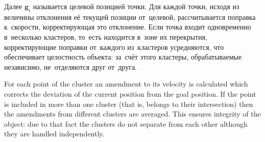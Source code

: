 \documentclass[a4paper, 12pt, titlepage]{extarticle}
\newcommand{\vect}[1]{\mathbf{#1}} %
\begin{document}
\begin{original}
        Далее $\vect{g}_i$ называется целевой позицией точки. Для каждой точки, исходя из величины
        отклонения её текущей позиции от~целевой, рассчитывается поправка к~скорости, корректирующая
        это отклонение. Если точка входит одновременно в~несколько кластеров, то~есть находится
        в~зоне их перекрытия, корректирующие поправки от~каждого из~кластеров усредняются, что
        обеспечивает целостность объекта: за~счёт этого кластеры, обрабатываемые независимо,
        не~отделяются друг от~друга.
\end{original}

        For each point of the cluster an amendment to its velocity is calculated which corrects the
        deviation of the current position from the goal position. If the point is included in more
        than one cluster (that is, belongs to their intersection) then the amendments from different
        clusters are averaged. This ensures integrity of the object: due to that fact the clusters
        do not separate from each other although they are handled independently.
\end{document}
